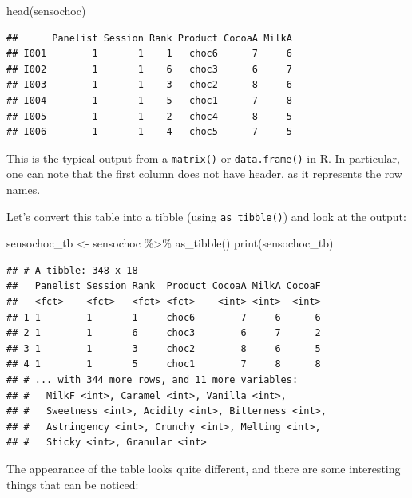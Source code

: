 \documentclass[
]{krantz}
\makeatletter
\newenvironment{Shaded}{\begin{snugshade}}{\end{snugshade}}
\newcommand{\FunctionTok}[1]{\textcolor[rgb]{0,0,0}{#1}}
\newcommand{\NormalTok}[1]{#1}
\newcommand{\OtherTok}[1]{\textcolor[rgb]{0.37,0.37,0.37}{#1}}
\newcommand{\SpecialCharTok}[1]{\textcolor[rgb]{0,0,0}{#1}}
\newenvironment{kframe}{%
\medskip{}
\setlength{\fboxsep}{.8em}
 \def\at@end@of@kframe{}%
 \ifinner\ifhmode%
  \def\at@end@of@kframe{\end{minipage}}%
  \begin{minipage}{\columnwidth}%
 \fi\fi%
 \def\FrameCommand##1{\hskip\@totalleftmargin \hskip-\fboxsep
 \colorbox{shadecolor}{##1}\hskip-\fboxsep
     \hskip-\linewidth \hskip-\@totalleftmargin \hskip\columnwidth}%
 \MakeFramed {\advance\hsize-\width
   \@totalleftmargin\z@ \linewidth\hsize
   \@setminipage}}%
 {\par\unskip\endMakeFramed%
 \at@end@of@kframe}
\renewenvironment{Shaded}{\begin{kframe}}{\end{kframe}}
\makeatother
\begin{document}
\begin{Shaded}
\begin{Highlighting}[]
\FunctionTok{head}\NormalTok{(sensochoc)}
\end{Highlighting}
\end{Shaded}

\begin{verbatim}
##      Panelist Session Rank Product CocoaA MilkA
## I001        1       1    1   choc6      7     6
## I002        1       1    6   choc3      6     7
## I003        1       1    3   choc2      8     6
## I004        1       1    5   choc1      7     8
## I005        1       1    2   choc4      8     5
## I006        1       1    4   choc5      7     5
\end{verbatim}

This is the typical output from a \texttt{matrix()} or \texttt{data.frame()} in R. In particular, one can note that the first column does not have header, as it represents the row names.

Let's convert this table into a tibble (using \texttt{as\_tibble()}) and look at the output:

\begin{Shaded}
\begin{Highlighting}[]
\NormalTok{sensochoc\_tb }\OtherTok{\textless{}{-}}\NormalTok{ sensochoc }\SpecialCharTok{\%\textgreater{}\%} 
  \FunctionTok{as\_tibble}\NormalTok{()}
\FunctionTok{print}\NormalTok{(sensochoc\_tb)}
\end{Highlighting}
\end{Shaded}

\begin{verbatim}
## # A tibble: 348 x 18
##   Panelist Session Rank  Product CocoaA MilkA CocoaF
##   <fct>    <fct>   <fct> <fct>    <int> <int>  <int>
## 1 1        1       1     choc6        7     6      6
## 2 1        1       6     choc3        6     7      2
## 3 1        1       3     choc2        8     6      5
## 4 1        1       5     choc1        7     8      8
## # ... with 344 more rows, and 11 more variables:
## #   MilkF <int>, Caramel <int>, Vanilla <int>,
## #   Sweetness <int>, Acidity <int>, Bitterness <int>,
## #   Astringency <int>, Crunchy <int>, Melting <int>,
## #   Sticky <int>, Granular <int>
\end{verbatim}

The appearance of the table looks quite different, and there are some interesting things that can be noticed:
\end{document}
